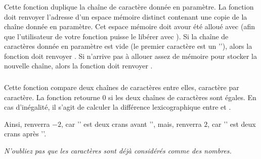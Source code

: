 \subsubsection*{}

\noindent Cette fonction duplique la chaîne de caractère donnée en paramètre.
La fonction doit renvoyer l'adresse d'un espace mémoire distinct contenant une copie de la chaîne donnée en paramètre.
Cet espace mémoire doit avour été alloué avec  (afin que l'utilisateur de votre fonction puisse le libérer avec ).
Si la chaîne de caractères donnée en paramètre est vide (le premier caractère est un ''), alors la fonction doit renvoyer .
Si  n'arrive pas à allouer assez de mémoire pour stocker la nouvelle chaîne, alors la fonction doit renvoyer .


\subsubsection*{}

\noindent Cette fonction compare deux chaînes de caractères entre elles, caractère par caractère.
La fonction retourne $ 0 $ si les deux chaînes de caractères sont égales.
En cas d'inégalité, il s'agit de calculer la différence lexicographique entre  et .

\noindent Ainsi,  renverra $ -2 $, car '' est deux crans avant '', mais,   renverra $ 2 $, car '' est deux crans après ''.

\noindent \textit{N'oubliez pas que les caractères sont déjà considérés comme des nombres.}
